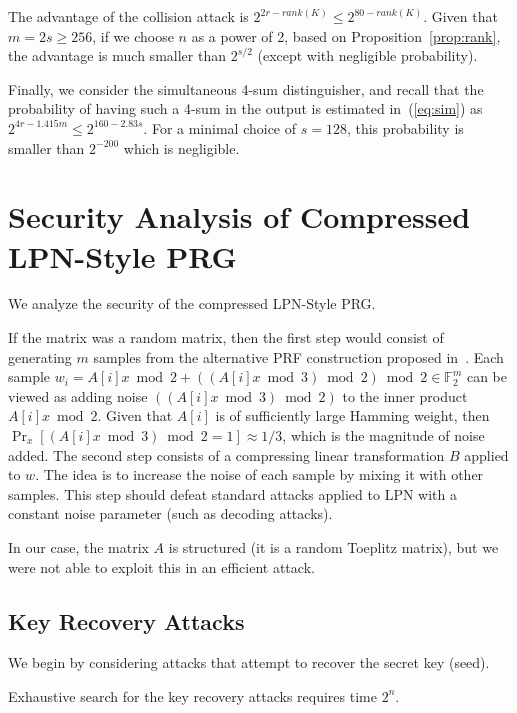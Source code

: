 \documentclass[orivec,envcountsect]{llncs}
\begin{document}
The advantage of the collision attack is $2^{2r - rank(K)} \leq 2^{80 - rank(K)}$.
Given that $m = 2s \geq 256$, if we choose $n$ as a power of 2,
based on Proposition~\ref{prop:rank},
the advantage is much smaller than $2^{s/2}$ (except with negligible probability).

Finally, we consider the simultaneous 4-sum distinguisher,
and recall that the probability of having such a 4-sum in the output is estimated
in~(\ref{eq:sim}) as $2^{4r - 1.415 m} \leq 2^{160 - 2.83s}$.
For a minimal choice of $s = 128$, this probability is smaller than $2^{-200}$
which is negligible.



\section{Security Analysis of Compressed LPN-Style PRG}

We analyze the security of the compressed LPN-Style PRG.

If the matrix was a random matrix, then
the first step would consist of generating $m$ samples from the alternative PRF construction proposed
in~\cite{BonehIPSW18}. Each sample
$w_i = A[i] x \bmod 2 + ((A[i] x \bmod 3) \bmod 2) \bmod 2 \in \mathbb{F}_2^m$
can be viewed as adding noise $((A[i] x \bmod 3) \bmod 2)$ to the inner product $A[i] x \bmod 2$.
Given that $A[i]$ is of sufficiently large Hamming weight, then
$\Pr_x[(A[i] x \bmod 3) \bmod 2 = 1] \approx 1/3$, which is the magnitude of noise added.
The second step consists of a compressing linear transformation $B$ applied to $w$.
The idea is to increase the noise of each sample by mixing it with other samples.
This step should defeat standard attacks applied to LPN with a constant noise parameter
(such as decoding attacks).

In our case, the matrix $A$ is structured (it is a random Toeplitz matrix),
but we were not able to exploit this in an efficient attack.



\subsection{Key Recovery Attacks}

We begin by considering attacks that attempt to recover the secret key (seed).

Exhaustive search for the key recovery attacks requires time $2^n$.
\end{document}
